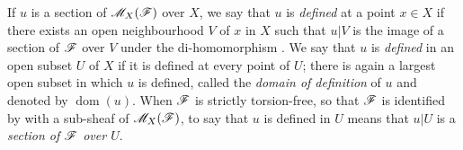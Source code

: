 \begin{env}[20.1.7]\label{IV.20.1.7}
If $u$ is a section of $\mathscr{M}_X(\mathscr{F})$ over $X$, we say that $u$ is \emph{defined} at a point $x\in X$ if there exists an open neighbourhood $V$ of $x$ in $X$ such that $u|V$ is the image of a section of $\mathscr{F}$ over $V$ under the di-homomorphism .
We say that $u$ is \emph{defined} in an open subset $U$ of $X$ if it is defined at every point of $U$; there is again a largest open subset in which $u$ is defined, called the \emph{domain of definition} of $u$ and denoted by $\operatorname{dom}(u)$.
When $\mathscr{F}$ is strictly torsion-free, so that $\mathscr{F}$ is identified by  with a sub-sheaf of $\mathscr{M}_X(\mathscr{F})$, to say that $u$ is defined in $U$ means that $u|U$ is a \emph{section of $\mathscr{F}$ over $U$}.
\end{env}

